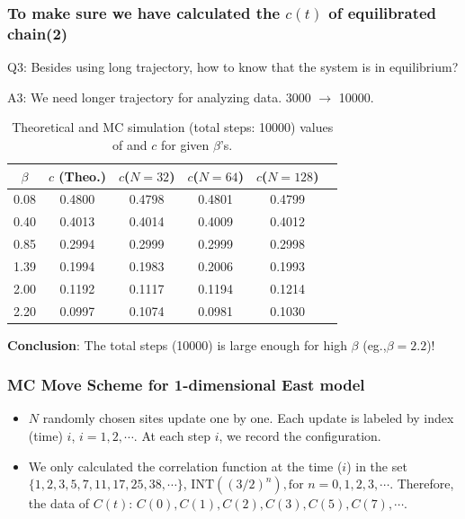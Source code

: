 \documentclass[8pt]{beamer}
\begin{document}
\begin{frame}
	\frametitle{To make sure we have calculated the $c(t)$ of equilibrated chain(2)}
	Q3: Besides using long trajectory, how to know that the system is in equilibrium?  
	
	A3: We need longer trajectory for analyzing data.  3000 $\to$  10000.
	
	\begin{table}[htbp]
		\centering
		\caption{\label{tab:table_lino3} Theoretical and MC simulation (total steps: 10000) values of and $c$ for given $\beta$'s.}
		\begin{tabular}{cccccc}
			$\beta$ & $c$ (Theo.) & $c$($N=32$) & $c$($N=64$) & $c$($N=128$) \\
			\hline
			0.08 & 0.4800  & 0.4798 &  0.4801 & 0.4799  \\
			0.40 & 0.4013 & 0.4014 &   0.4009 & 0.4012  \\
			0.85 & 0.2994 & 0.2999 &  0.2999 & 0.2998 \\
			1.39 & 0.1994 & 0.1983 &  0.2006 & 0.1993  \\
			2.00 & 0.1192 & 0.1117 & 0.1194 & 0.1214 \\
			2.20 & 0.0997 & 0.1074 & 0.0981 & 0.1030 
		\end{tabular}
	\end{table}
		\textbf{Conclusion}:  The total steps (10000) is large enough for high $\beta$ (eg.,$\beta=2.2$)! 
\end{frame}

\begin{frame}
	\frametitle{MC Move Scheme for 1-dimensional East model}
	\begin{itemize}
        \item $N$ randomly chosen sites update one by one. Each update is labeled by index (time) $i$, $i=1,2,\cdots$. At each step $i$, we record the configuration.  
        \item We only calculated the correlation function at the time ($i$) in the set $\{ 1, 2, 3, 5, 7, 11, 17, 25, 38,\cdots\}$, $\text{INT}((3/2)^n), \text{for } n= 0,1,2,3,\cdots$. Therefore, the data of $C(t)$: $C(0), C(1), C(2), C(3), C(5),C(7),\cdots.$ 
    \end{itemize}
\end{frame}
\end{document}

